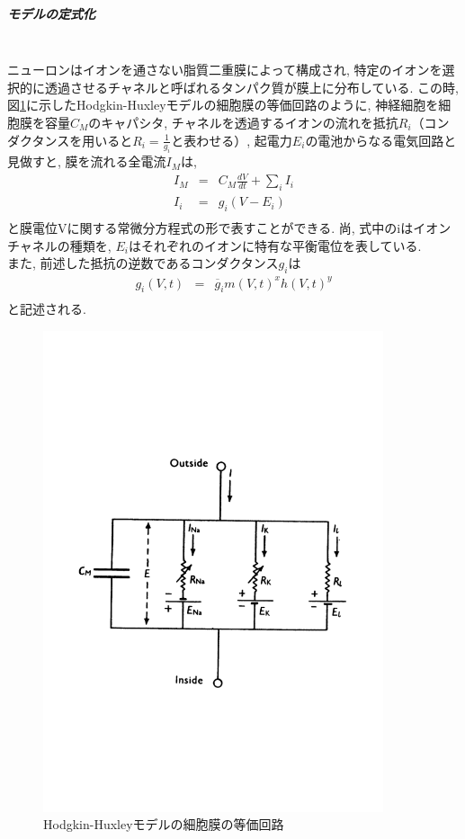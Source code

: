 \subparagraph{モデルの定式化}~\\
\label{subpar-hh-model}
ニューロンはイオンを通さない脂質二重膜によって構成され, 特定のイオンを選択的に透過させるチャネルと呼ばれるタンパク質が膜上に分布している.
この時, 図\ref{fig:hh-circuit}に示したHodgkin-Huxleyモデルの細胞膜の等価回路のように,
神経細胞を細胞膜を容量$C_M$のキャパシタ, チャネルを透過するイオンの流れを抵抗$R_i$（コンダクタンスを用いると$R_i = \frac{1}{g_i}$と表わせる）, 起電力$E_i$の電池からなる電気回路と見做すと, 膜を流れる全電流$I_M$は,
\begin{eqnarray}
  I_M & = & C_M\frac{dV}{dt} + \sum_{i} I_i\\
  I_i & = & g_i (V - E_i)\\
\end{eqnarray}
と膜電位Vに関する常微分方程式の形で表すことができる. 尚, 式中のiはイオンチャネルの種類を, $E_i$はそれぞれのイオンに特有な平衡電位を表している.\\
また, 前述した抵抗の逆数であるコンダクタンス$g_i$は
\begin{eqnarray}
  g_i(V, t) & = &\overline{g}_im(V, t)^xh(V,t)^y\\
\end{eqnarray}
と記述される.\\
\clearpage
\begin{figure}[htb]
 \begin{center}
    \includegraphics[width=10cm]{./images/hh-circuit.pdf}
    \caption{Hodgkin-Huxleyモデルの細胞膜の等価回路}
    \label{fig:hh-circuit}
 \end{center}
\end{figure}

